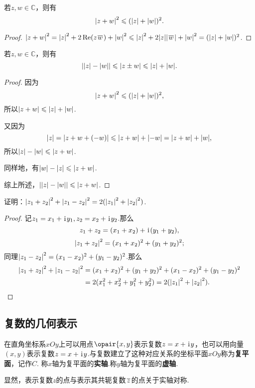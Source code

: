 \begin{theorem}
若\(z,w \in \mathbb{C}\)，则有\begin{equation}
\abs{z + w}^2 \leqslant (\abs{z} + \abs{w})^2.
\end{equation}
\begin{proof}
\(
\abs{z + w}^2
= \abs{z}^2 + 2 \Re(z \kern1pt\overline{w}\kern1pt) + \abs{w}^2
\leqslant \abs{z}^2 + 2 \abs{z}\abs{\kern1pt\overline{w}\kern1pt} + \abs{w}^2
= (\abs{z} + \abs{w})^2
\).
\end{proof}
\end{theorem}

\begin{theorem}[三角不等式]
若\(z,w \in \mathbb{C}\)，则有\begin{equation}
\abs{\abs{z}-\abs{w}} \leqslant \abs{z \pm w} \leqslant \abs{z} + \abs{w}.
\end{equation}
\begin{proof}
因为\[
\abs{z + w}^2 \leqslant (\abs{z} + \abs{w})^2,
\]所以\(\abs{z + w} \leqslant \abs{z} + \abs{w}\).

又因为\[
\abs{z} = \abs{z + w + (-w)} \leqslant \abs{z+w} + \abs{-w} = \abs{z+w} + \abs{w},
\]所以\(\abs{z}-\abs{w} \leqslant \abs{z+w}\).

同样地，有\(\abs{w}-\abs{z} \leqslant \abs{z+w}\).

综上所述，\(\abs{\abs{z}-\abs{w}}\leqslant\abs{z+w}\).
\end{proof}
\end{theorem}

\begin{example}
证明：\(\abs{z_1+z_2}^2 + \abs{z_1-z_2}^2 = 2 (\abs{z_1}^2 + \abs{z_2}^2)\).
\begin{proof}
记\(z_1 = x_1 + \kern1pt\mathrm{i}\kern1pt y_1, z_2 = x_2 + \kern1pt\mathrm{i}\kern1pt y_2\).那么\[
z_1+z_2 = (x_1+x_2) + \kern1pt\mathrm{i}\kern1pt(y_1+y_2),
\]\[
\abs{z_1+z_2}^2 = (x_1+x_2)^2 + (y_1+y_2)^2;
\]同理\(\abs{z_1-z_2}^2 = (x_1-x_2)^2 + (y_1-y_2)^2\).那么\begin{align*}
\abs{z_1+z_2}^2 + \abs{z_1-z_2}^2
&= (x_1+x_2)^2 + (y_1+y_2)^2
+ (x_1-x_2)^2 + (y_1-y_2)^2 \\
&= 2 ( x_1^2 + x_2^2 + y_1^2 + y_2^2 )
= 2 ( \abs{z_1}^2 + \abs{z_2}^2 ).
\qedhere
\end{align*}
\end{proof}
\end{example}

\subsection{复数的几何表示}
\begin{definition}[复数在复平面上的几何表示]
在直角坐标系\(xOy\)上可以用点\(\opair{x,y}\)表示复数\(z=x+\kern1pt\mathrm{i}\kern1pt y\)，也可以用向量\((x,y)\)表示复数\(z=x+\kern1pt\mathrm{i}\kern1pt y\).与复数建立了这种对应关系的坐标平面\(xOy\)称为\textbf{复平面}，记作\(C\).
称\(x\)轴为复平面的\textbf{实轴}.称\(y\)轴为复平面的\textbf{虚轴}.

显然，表示复数\(z\)的点与表示其共轭复数\(\kern1pt\overline{z}\kern1pt\)的点关于实轴对称.
\end{definition}

